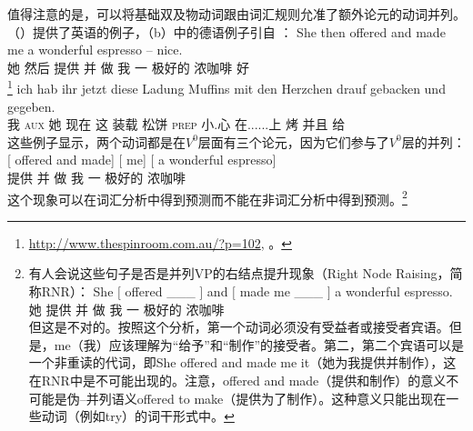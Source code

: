 \noindent
    值得注意的是，可以将基础双及物动词跟由词汇规则允准了额外论元的动词并列。（）提供了英语的例子，（b）中的德语例子引自 ：
\eal
\label{promise-make}
\ex 
\gll She then offered and made me a wonderful espresso -- nice.\\
     她  然后 提供 并 做 我 一 极好的 浓咖啡 {} 好\\
\footnote{%
\url{http://www.thespinroom.com.au/?p=102}, 。
}
\ex 
\label{ex-gebacken-und-gegeben}
\gll ich hab ihr jetzt diese Ladung Muffins mit den Herzchen drauf gebacken und gegeben.\footnotemark\\
     我 \textsc{aux} 她 现在 这 装载 松饼 \textsc{prep}  小.心 在......上 烤 并且 给\\
\zl
\noindent
这些例子显示，两个动词都是在$V^0$层面有三个论元，因为它们参与了$V^0$层的并列：
\ea
\gll 
{}[\sub{\vnull} offered and made] [ me]    [ a wonderful espresso] \\
{}\spacebr{} 提供 并 做 \spacebr{} 我 \spacebr{} 一 极好的 浓咖啡\\
\z
这个现象可以在词汇分析中得到预测而不能在非词汇分析中得到预测。\footnote{%
有人会说这些句子是否是并列VP的右结点提升现象（Right Node Raising，简称RNR）\citep{Bresnan74a-u, Abbott76a-u}： 
\ea \label{rnr}
\gll
She $[$ offered  \_\_\_  $]$ and $[$ made me \_\_\_ $]$  a wonderful espresso. \\
她 \spacebr{} 提供 {} \spacebr{} 并 \spacebr{} 做 我 {} \spacebr{} 一 极好的 浓咖啡\\
\z
但这是不对的。按照这个分析，第一个动词必须没有受益者或接受者宾语。但是，me（我）应该理解为“给予”和“制作”的接受者。第二，第二个宾语可以是一个非重读的代词，即She offered and made me it（她为我提供并制作），这在RNR中是不可能出现的。注意，offered and made（提供和制作）的意义不可能是伪--并列语义offered to make（提供为了制作）。这种意义只能出现在一些动词（例如try）的词干形式中。
}  
